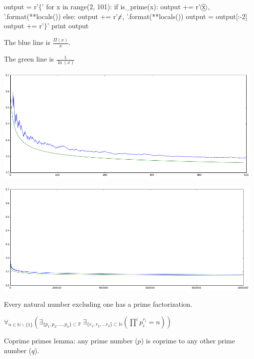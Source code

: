 \item 
\newcommand*\circled[1]{
\tikz[baseline=(char.base)]{
\node[shape=circle,draw,inner sep=1pt] (char) {#1};
}
}

\begin{python}[tools.py]
output = r'$\{$'
for x in range(2, 101):
    if is_prime(x):
        output += r'$\circled{{{x}}}$, '.format(**locals())
    else:
        output += r'$\cancel{{{x}}}$, '.format(**locals())
output = output[:-2]
output += r'$\}$'
print output
\end{python}

\item 
The blue line is $\frac{\Pi(x)}{x}$.

The green line is $\frac{1}{\ln(x)}$

\includegraphics[width=5.5in]{primes_small.png}

\includegraphics[width=5.5in]{primes_large.png}

\item Every natural number excluding one has a prime factorization.

$\forall_{n \in \mathbb{N}\backslash\{1\}} (\exists _{\{p_1, p_2, \dots, p_n\} \subset \mathbb{P}} ~ \exists _{\{r_1, r_2, \dots r_3\} \subset \mathbb{N}} (\prod\limits^i p_i^{r_i} = n))$

\item 

Coprime primes lemma: any prime number ($p$) is coprime to any other prime number ($q$).

